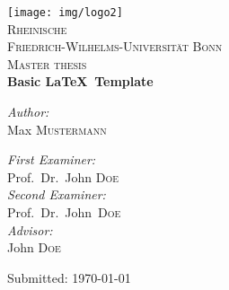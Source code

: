 \documentclass[8pt, %
a5paper, %
twoside, %
openright, %
abstract=off, %
DIV=11,      %
BCOR=8mm]{scrbook} %
\begin{document}
    \frontmatter

    \begin{titlepage}
        \begin{center}

            \texttt{[image: img/logo2]}\\[1cm]

            \textsc{\LARGE Rheinische\\[5mm] Friedrich-Wilhelms-Universität Bonn}\\[1.5cm]

            \textsc{\Large Master thesis}\\[1.5cm]

            { \Large \bfseries Basic \LaTeX \, Template }\\[1.4cm]

            \begin{minipage}[t]{0.4\textwidth}
                \begin{flushleft} \large
                    \emph{Author:}\\
                    Max \textsc{Mustermann}
                \end{flushleft}
            \end{minipage}
            \begin{minipage}[t]{0.5\textwidth}
                \begin{flushright} \large
                    \emph{First Examiner:} \\
                    Prof.~Dr.~John \textsc{Doe} \\[0.5cm]
                    \emph{Second Examiner:} \\
                    Prof.~Dr.~John~\textsc{Doe} \\[0.5cm]

                    \emph{Advisor:} \\
                    John \textsc{Doe} \\[0.5cm]
                \end{flushright}
            \end{minipage}

            \vfill

            {\large Submitted:\hspace{1cm} \today}

        \end{center}
    \end{titlepage}
\end{document}
